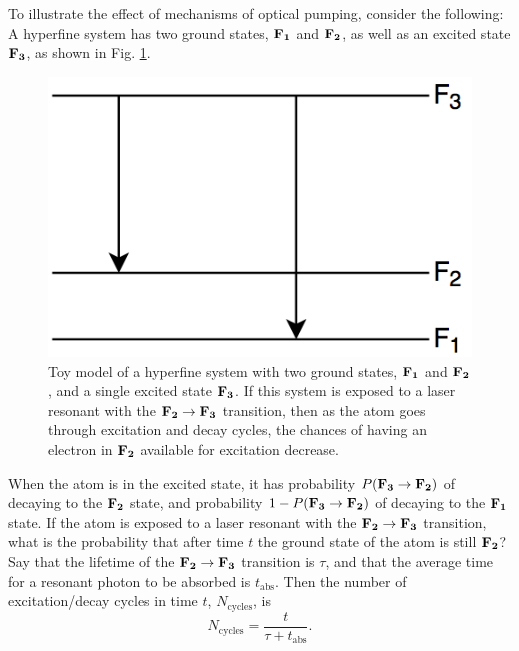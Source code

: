 To illustrate the effect of mechanisms of optical pumping, consider the following: A hyperfine system has two ground states, $\bf{F}_1$ and $\bf{F}_2$, as well as an excited state $\bf{F}_3$, as shown in Fig. \ref{toy_model}.
\begin{figure}[h]
\begin{center}
\includegraphics[width=\textwidth]{Graphics/Toy_model.png}
\caption[Toy model of a hyperfine system with two ground states.]{\small Toy model of a hyperfine system with two ground states, $\bf{F}_1$ and $\bf{F}_2$, and a single excited state $\bf{F}_3$. If this system is exposed to a laser resonant with the $\bf{F}_2 \rightarrow \bf{F}_3$ transition, then as the atom goes through excitation and decay cycles, the chances of having an electron in $\bf{F}_2$ available for excitation decrease.}
\label{toy_model}
\end{center}
\end{figure}
When the atom is in the excited state, it has probability $P(\bf{F}_3 \rightarrow \bf{F}_2)$ of decaying to the $\bf{F}_2$ state, and probability $1-P(\bf{F}_3 \rightarrow \bf{F}_2)$ of decaying to the $\bf{F}_1$ state. If the atom is exposed to a laser resonant with the $\bf{F}_2 \rightarrow \bf{F}_3$ transition, what is the probability that after time $t$ the ground state of the atom is still $\bf{F}_2$? Say that the lifetime of the $\bf{F}_2 \rightarrow \bf{F}_3$ transition is $\tau$, and that the average time for a resonant photon to be absorbed is $t_{\mathrm{abs}}$. Then the number of excitation/decay cycles in time $t$, $N_{\mathrm{cycles}}$, is
\begin{equation}
N_{\mathrm{cycles}}=\frac{t}{\tau+t_{\mathrm{abs}}}.
\end{equation}
